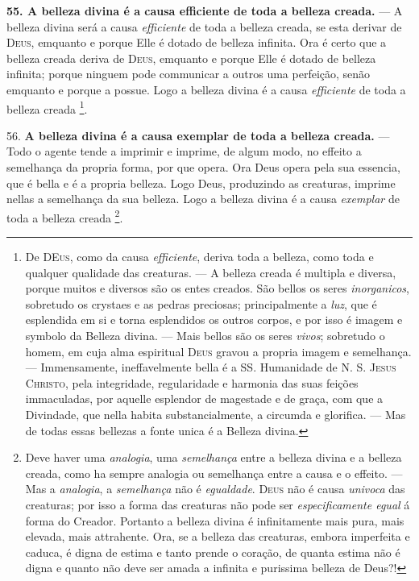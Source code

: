 \textbf{55. A belleza divina é a causa efficiente de toda a belleza creada.} --- A belleza divina será a causa \emph{efficiente} de toda a belleza creada, se esta derivar de \textsc{Deus}, emquanto e porque Elle é dotado de belleza infinita. Ora é certo que a belleza creada deriva de \textsc{Deus}, emquanto e porque Elle é dotado de belleza infinita; porque ninguem pode communicar a outros uma  perfeição, senão emquanto e porque a possue. Logo a belleza divina é a causa \emph{efficiente} de toda a belleza creada \footnote{De \textsc{DEus}, como da causa \emph{efficiente}, deriva toda a belleza, como toda e qualquer qualidade das creaturas. --- A belleza creada é multipla e diversa, porque muitos e diversos são os entes creados. São bellos os seres \emph{inorganicos}, sobretudo os crystaes e as pedras preciosas; principalmente a \emph{luz}, que é esplendida em si e torna esplendidos os outros corpos, e por isso é imagem e symbolo da Belleza divina. --- Mais bellos são os seres \emph{vivos}; sobretudo o homem, em cuja alma espiritual \textsc{Deus} gravou a propria imagem e semelhança. --- Immensamente, ineffavelmente bella é a SS. Humanidade de N. S. \textsc{Jesus Christo}, pela integridade, regularidade e harmonia das suas feições immaculadas, por aquelle esplendor de magestade e de graça, com que a Divindade, que nella habita substancialmente, a circumda e glorifica. --- Mas de todas essas bellezas a fonte unica é a Belleza divina.}.

56. \textbf{A belleza divina é a causa exemplar de toda a belleza creada.} --- Todo o agente tende a imprimir e imprime, de algum modo, no effeito a semelhança da propria forma, por que opera. Ora Deus opera pela sua essencia, que é bella e é a propria belleza. Logo Deus, produzindo as creaturas, imprime nellas a semelhança da sua belleza. Logo a belleza divina é a causa \emph{exemplar} de toda a belleza creada \footnote{Deve haver uma \emph{analogia}, uma \emph{semelhança} entre a belleza divina e a belleza creada, como ha sempre analogia ou semelhança entre a causa e o effeito. --- Mas a \emph{analogia}, a \emph{semelhança} não é \emph{egualdade}. \textsc{Deus} não é causa \emph{univoca} das creaturas; por isso a forma das creaturas não pode ser \emph{especificamente egual} á forma do Creador. Portanto a belleza divina é infinitamente mais pura, mais elevada, mais attrahente. Ora, se a belleza das creaturas, embora imperfeita e caduca, é digna de estima e tanto prende o coração, de quanta estima não é digna e quanto não deve ser amada a infinita e purissima belleza de Deus?!}.


